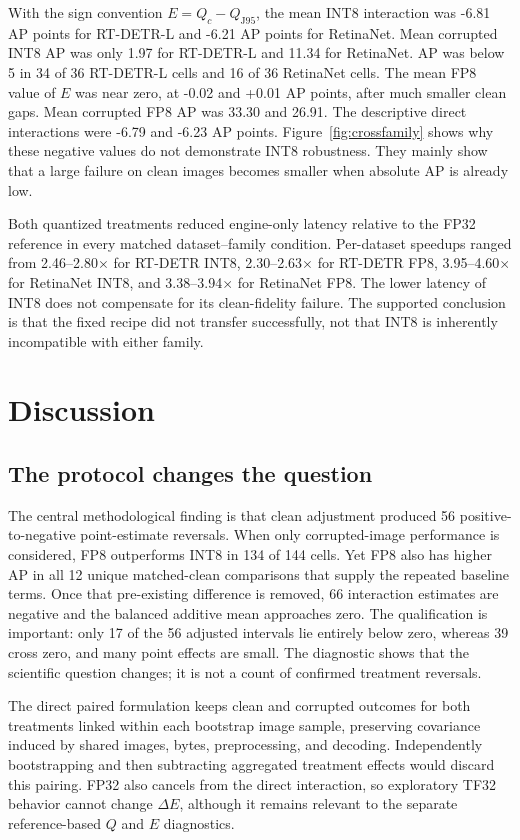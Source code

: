 \documentclass[a4paper,fleqn]{cas-dc}
\newcommand{\Jclean}{\mathrm{J95}}
\begin{document}
With the sign convention $E=Q_c-Q_{\Jclean}$, the mean INT8 interaction was -6.81 AP points for RT-DETR-L and -6.21 AP points for RetinaNet. Mean corrupted INT8 AP was only 1.97 for RT-DETR-L and 11.34 for RetinaNet. AP was below 5 in 34 of 36 RT-DETR-L cells and 16 of 36 RetinaNet cells. The mean FP8 value of $E$ was near zero, at -0.02 and +0.01 AP points, after much smaller clean gaps. Mean corrupted FP8 AP was 33.30 and 26.91. The descriptive direct interactions were -6.79 and -6.23 AP points. Figure~\ref{fig:crossfamily} shows why these negative values do not demonstrate INT8 robustness. They mainly show that a large failure on clean images becomes smaller when absolute AP is already low.

Both quantized treatments reduced engine-only latency relative to the FP32 reference in every matched dataset--family condition. Per-dataset speedups ranged from 2.46--2.80$\times$ for RT-DETR INT8, 2.30--2.63$\times$ for RT-DETR FP8, 3.95--4.60$\times$ for RetinaNet INT8, and 3.38--3.94$\times$ for RetinaNet FP8. The lower latency of INT8 does not compensate for its clean-fidelity failure. The supported conclusion is that the fixed recipe did not transfer successfully, not that INT8 is inherently incompatible with either family.

\FloatBarrier
\section{Discussion}
\label{sec:discussion}

\subsection{The protocol changes the question}

The central methodological finding is that clean adjustment produced 56 positive-to-negative point-estimate reversals. When only corrupted-image performance is considered, FP8 outperforms INT8 in 134 of 144 cells. Yet FP8 also has higher AP in all 12 unique matched-clean comparisons that supply the repeated baseline terms. Once that pre-existing difference is removed, 66 interaction estimates are negative and the balanced additive mean approaches zero. The qualification is important: only 17 of the 56 adjusted intervals lie entirely below zero, whereas 39 cross zero, and many point effects are small. The diagnostic shows that the scientific question changes; it is not a count of confirmed treatment reversals.

The direct paired formulation keeps clean and corrupted outcomes for both treatments linked within each bootstrap image sample, preserving covariance induced by shared images, bytes, preprocessing, and decoding. Independently bootstrapping and then subtracting aggregated treatment effects would discard this pairing. FP32 also cancels from the direct interaction, so exploratory TF32 behavior cannot change $\Delta E$, although it remains relevant to the separate reference-based $Q$ and $E$ diagnostics.
\end{document}
